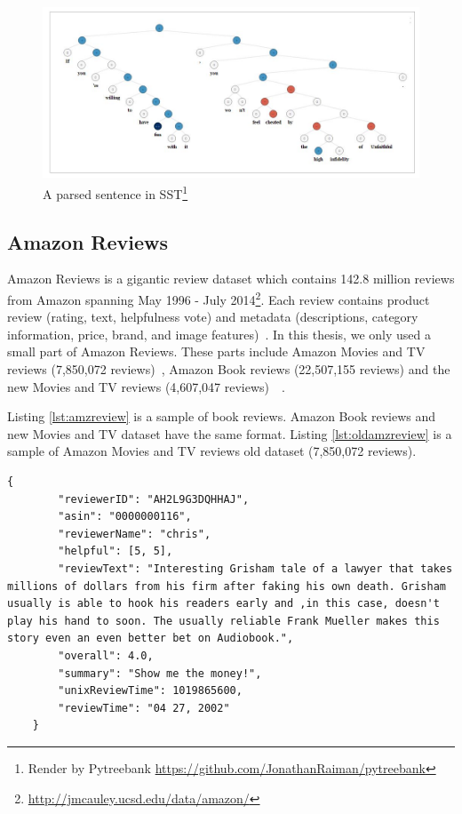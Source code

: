 \begin{figure}[H]
    \begin{minipage}{\textwidth}
        \centering
        \includegraphics[width=0.9\linewidth]{figure/sst}
        \caption[A parsed sentence in SST]{A parsed sentence in SST\footnote{Render by Pytreebank \url{https://github.com/JonathanRaiman/pytreebank}}}
        \label{fig:sst}
    \end{minipage}
\end{figure}

\subsection{Amazon Reviews}\label{sec:amazon}
Amazon Reviews is a gigantic review dataset
which contains 142.8 million reviews from Amazon spanning May 1996 - July 2014\footnote{\url{http://jmcauley.ucsd.edu/data/amazon/}}.
Each review contains product review (rating, text, helpfulness vote) and metadata (descriptions, category information, price, brand, and image features)~\cite{amazon-reviews}.
In this thesis, we only used a small part of Amazon Reviews.
These parts include Amazon Movies and TV reviews (7,850,072 reviews)~\cite{mcauley2013hidden}, Amazon Book reviews (22,507,155 reviews) and the new Movies and TV reviews (4,607,047 reviews)~\cite{McAuleyTSH15}~\cite{HeM16}.

Listing \ref{lst:amzreview} is a sample of book reviews.
Amazon Book reviews and new Movies and TV dataset have the same format. Listing \ref{lst:oldamzreview} is a sample of Amazon Movies and TV reviews old dataset (7,850,072 reviews).

\begin{lstlisting}[caption={Amazon reviews sample},label={lst:amzreview}]
    {
        "reviewerID": "AH2L9G3DQHHAJ",
        "asin": "0000000116",
        "reviewerName": "chris",
        "helpful": [5, 5],
        "reviewText": "Interesting Grisham tale of a lawyer that takes millions of dollars from his firm after faking his own death. Grisham usually is able to hook his readers early and ,in this case, doesn't play his hand to soon. The usually reliable Frank Mueller makes this story even an even better bet on Audiobook.",
        "overall": 4.0,
        "summary": "Show me the money!",
        "unixReviewTime": 1019865600,
        "reviewTime": "04 27, 2002"
    }
\end{lstlisting}

